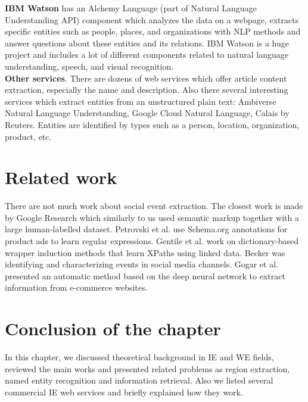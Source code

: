 \noindent \textbf{IBM Watson}\cite{IBMAlchemy} has an Alchemy Language (part of Natural Language Understanding API) component which analyzes the data on a webpage, extracts specific entities such as people, places, and organizations with NLP methods and answer questions about these entities and its relations. IBM Watson is a huge project and includes a lot of different components related to natural language understanding, speech, and visual recognition.\\  

\noindent\textbf{Other services}. There are dozens of web services which offer article content extraction, especially the name and description. Also there several interesting services which extract entities from an unstructured plain text: Ambiverse Natural Language Understanding\cite{Ambiverse}, Google Cloud Natural Language\cite{GoogNLP}, Calais by Reuters\cite{calais}. Entities are identified by types such as a person, location, organization, product, etc.

\section{Related work}

There are not much work about social event extraction. The closest work is made by Google Research\cite{GoogEvent} which similarly to us used semantic markup together with a large human-labelled dataset. Petrovski et al.\cite{Petrovski} use Schema.org annotations for product ads to learn regular expressions. Gentile et al.\cite{Gentile} work on dictionary-based wrapper induction methods that learn XPaths using linked data. Becker\cite{becker} was identifying
and characterizing events in social media channels. Gogar et al.\cite{Gogar2016}
presented an automatic method based on the deep neural network to extract information from e-commerce websites.

\section*{Conclusion of the chapter}
In this chapter, we discussed theoretical background in IE and WE fields, reviewed the main works and presented related problems as region extraction, named entity recognition and information retrieval. Also we listed several commercial IE web services and briefly explained how they work.